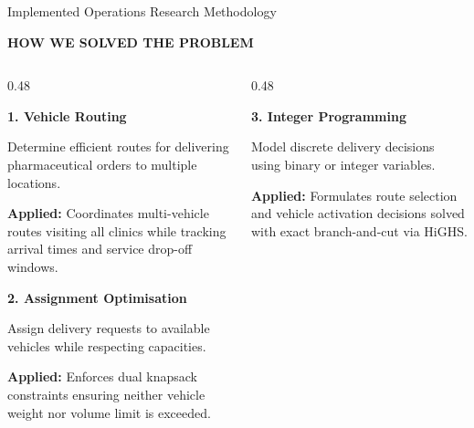 \documentclass[aspectratio=169,10pt]{beamer}
\newcommand{\sectiontag}[1]{%
    {\scriptsize\bfseries\color{Accent}\MakeUppercase{#1}}\par\vspace{0.08cm}
}
\begin{document}
\begin{frame}{Implemented Operations Research Methodology}

\sectiontag{How We Solved the Problem}

\vspace{0.08cm}

\small

\begin{columns}[T,totalwidth=\textwidth]

\begin{column}{0.48\textwidth}

\textbf{\color{Primary}\small 1. Vehicle Routing}

\vspace{0.05cm}

\footnotesize
Determine efficient routes for delivering pharmaceutical orders to multiple locations.

\vspace{0.04cm}

\textcolor{Muted}{\scriptsize
\textbf{Applied:} Coordinates multi-vehicle routes visiting all clinics while tracking arrival times and service drop-off windows.
}

\vspace{0.22cm}

\textbf{\color{Primary}\small 2. Assignment Optimisation}

\vspace{0.05cm}

\footnotesize
Assign delivery requests to available vehicles while respecting capacities.

\vspace{0.04cm}

\textcolor{Muted}{\scriptsize
\textbf{Applied:} Enforces dual knapsack constraints ensuring neither vehicle weight nor volume limit is exceeded.
}

\end{column}


\begin{column}{0.48\textwidth}

\textbf{\color{Primary}\small 3. Integer Programming}

\vspace{0.05cm}

\footnotesize
Model discrete delivery decisions using binary or integer variables.

\vspace{0.04cm}

\textcolor{Muted}{\scriptsize
\textbf{Applied:} Formulates route selection and vehicle activation decisions solved with exact branch-and-cut via HiGHS.
}


\end{column}
\end{columns}
\end{frame}
\end{document}
